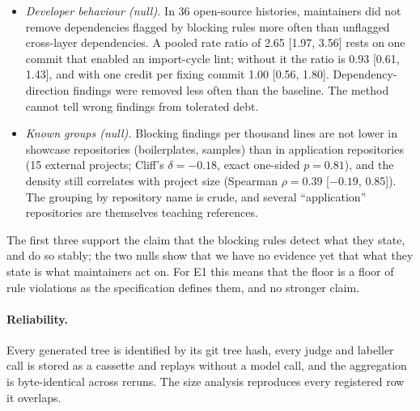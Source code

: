 \documentclass[10pt,a4paper]{article}
\begin{document}
\begin{itemize}
        file outside every layer hides an edge), fixed behind an option that is off by default; the others are
        intended consequences of rule definitions, mainly a merge that creates a real module cycle (13 cases). These
        are development data.
  \item \emph{Developer behaviour (null).} In 36 open-source histories, maintainers did not remove dependencies
        flagged by blocking rules more often than unflagged cross-layer dependencies. A pooled rate ratio of 2.65
        [1.97, 3.56] rests on one commit that enabled an import-cycle lint; without it the ratio is 0.93 [0.61, 1.43],
        and with one credit per fixing commit 1.00 [0.56, 1.80]. Dependency-direction findings were removed less often
        than the baseline. The method cannot tell wrong findings from tolerated debt.
  \item \emph{Known groups (null).} Blocking findings per thousand lines are not lower in showcase repositories
        (boilerplates, samples) than in application repositories (15 external projects; Cliff's $\delta = -0.18$,
        exact one-sided $p = 0.81$), and the density still correlates with project size (Spearman
        $\rho = 0.39$ [$-0.19$, 0.85]). The grouping by repository name is crude, and several ``application''
        repositories are themselves teaching references.
\end{itemize}
The first three support the claim that the blocking rules detect what they state, and do so stably; the two nulls
show that we have no evidence yet that what they state is what maintainers act on. For E1 this means that the floor
is a floor of rule violations as the specification defines them, and no stronger claim.

\paragraph{Reliability.} Every generated tree is identified by its git tree hash, every judge and labeller call is
stored as a cassette and replays without a model call, and the aggregation is byte-identical across reruns.
The size analysis reproduces every registered row it overlaps.
\end{document}
